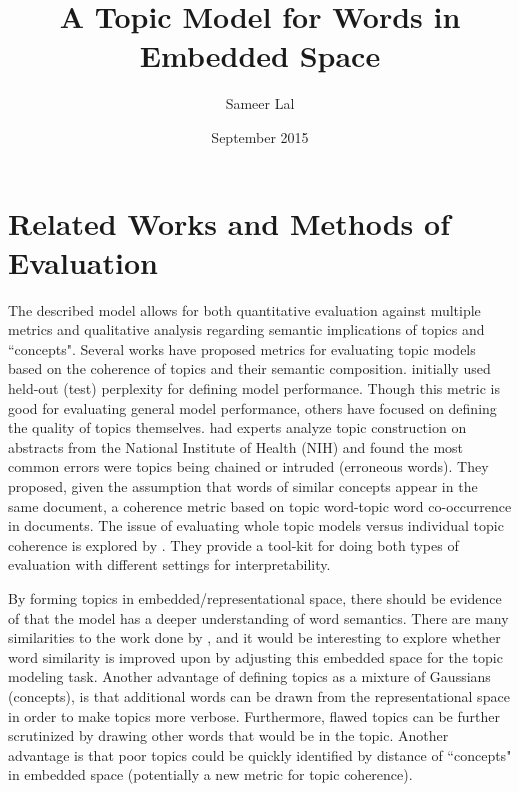 \documentclass{article}
\title{A Topic Model for Words in Embedded Space}
\author{Sameer Lal}
\date{September 2015}
\begin{document}
\maketitle

\section{Related Works and Methods of Evaluation}
The described model allows for both quantitative evaluation against multiple metrics and qualitative analysis regarding semantic implications of topics and ``concepts". Several works have proposed metrics for evaluating topic models based on the coherence of topics and their semantic composition. \cite{Blei} initially used held-out (test) perplexity for defining model performance. Though this metric is good for evaluating general model performance, others have focused on defining the quality of topics themselves. \cite{Mimno} had experts analyze topic construction on abstracts from the National Institute of Health (NIH) and found the most common errors were topics being chained or intruded (erroneous words). They proposed, given the assumption that words of similar concepts appear in the same document, a coherence metric based on topic word-topic word co-occurrence in documents. The issue of evaluating whole topic models versus individual topic coherence is explored by \cite{Newman}. They provide a tool-kit for doing both types of evaluation with different settings for interpretability.\par
By forming topics in embedded/representational space, there should be evidence of that the model has a deeper understanding of word semantics. There are many similarities to the work done by \cite{Vilnis}, and it would be interesting to explore whether word similarity is improved upon by adjusting this embedded space for the topic modeling task. Another advantage of defining topics as a mixture of Gaussians (concepts), is that additional words can be drawn from the representational space in order to make topics more verbose. Furthermore, flawed topics can be further scrutinized by drawing other words that would be in the topic. Another advantage is that poor topics could be quickly identified by distance of ``concepts" in embedded space (potentially a new metric for topic coherence). \par
\end{document}
